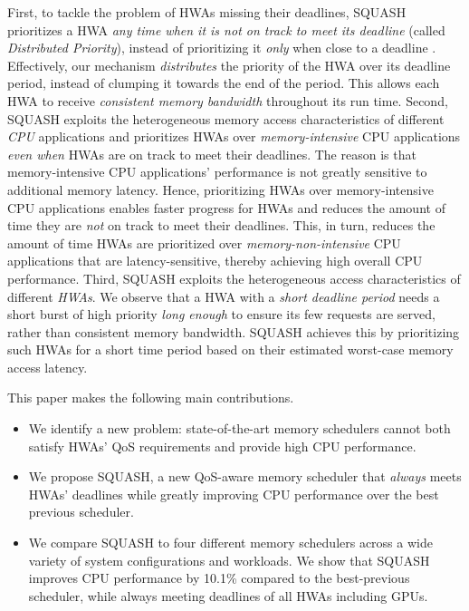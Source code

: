 \documentclass[10pt,letterpaper]{article}
\begin{document}
First, to tackle the problem of HWAs missing their deadlines, SQUASH
prioritizes a HWA \emph{any time when it is not on track to meet its deadline}
(called \emph{Distributed Priority}),
instead of prioritizing it \emph{only} when close to a deadline . Effectively, our mechanism \emph{distributes} the priority of the
HWA over its deadline period, instead of clumping it towards the end of
the period.  This allows each HWA to receive \emph{consistent memory bandwidth}
throughout its run time.
Second, SQUASH exploits the heterogeneous memory access characteristics of
different \emph{CPU} applications and prioritizes HWAs over \emph{memory-intensive}
CPU applications \emph{even when} HWAs are on track to meet their deadlines.
The reason is that memory-intensive CPU applications' performance is not greatly
sensitive to additional memory latency.
Hence, prioritizing HWAs over memory-intensive CPU applications enables
faster progress for HWAs and reduces the amount of time they are \emph{not} on track
to meet their deadlines. This, in turn, reduces the amount of time HWAs are
prioritized over \emph{memory-non-intensive} CPU applications that are
latency-sensitive, thereby achieving high overall CPU performance. Third,
SQUASH exploits the heterogeneous access characteristics of different
\emph{HWAs}.  We observe that a HWA with a \emph{short deadline period} needs a
short burst of high priority \emph{long enough} to ensure its few requests are served,
rather than consistent memory bandwidth. SQUASH achieves this by prioritizing
such HWAs for a short time period based on their estimated worst-case memory
access latency.







This paper makes the following main contributions.

\begin{itemize}

\item{We identify a new problem: state-of-the-art memory schedulers
cannot both satisfy HWAs' QoS requirements and provide high CPU performance.}

\item{We propose SQUASH, a new QoS-aware memory scheduler that \emph{always}
meets HWAs' deadlines while greatly improving CPU performance over the best previous scheduler.}
\item{We compare SQUASH to four different memory schedulers across a wide
variety of system configurations and workloads. We show that SQUASH
improves CPU performance by 10.1\% compared to the best-previous scheduler, while
always meeting deadlines of all HWAs including GPUs.}

\end{itemize}
\end{document}

